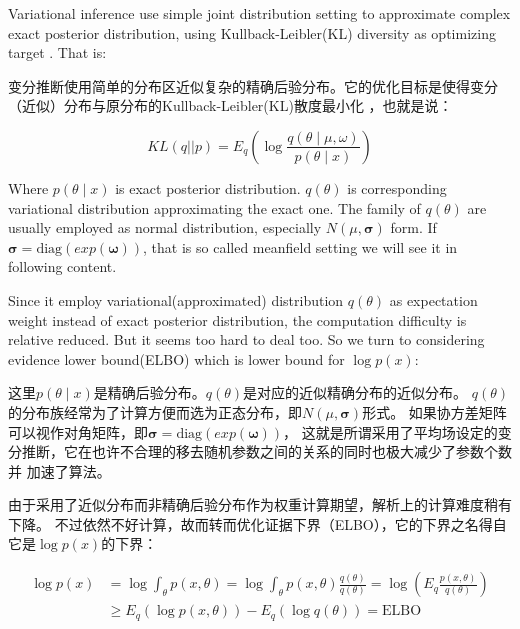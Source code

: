 \documentclass{article}
\begin{document}
Variational inference use simple joint distribution setting to approximate complex 
exact posterior distribution, using Kullback-Leibler(KL) diversity as optimizing target \cite{blei2017variational}. That is:

变分推断使用简单的分布区近似复杂的精确后验分布。它的优化目标是使得变分（近似）分布与原分布的Kullback-Leibler(KL)散度最小化
\cite{blei2017variational}，也就是说：

$$
KL(q||p) = E_q \left( \log \frac{q(\theta \mid \mu,\omega)}{p(\theta \mid x)} \right)
$$

Where $p(\theta \mid x)$ is exact posterior distribution. 
$q(\theta)$ is corresponding variational distribution approximating the exact one.
The family of $q(\theta)$ are usually employed as normal distribution, especially $N(\mu,\mathbf{\sigma})$ form.
If $\mathbf{\sigma}=\mathrm{diag}(exp(\mathbf{\omega}))$, 
that is so called meanfield setting we will see it in following content.

Since it employ variational(approximated) distribution $q(\theta)$ as expectation weight 
instead of exact posterior distribution,
the computation difficulty is relative reduced. But it seems too hard to deal too. 
So we turn to considering evidence lower bound(ELBO) which is lower bound for $\log p(x)$:

这里$p(\theta \mid x)$是精确后验分布。$q(\theta)$是对应的近似精确分布的近似分布。
$q(\theta)$的分布族经常为了计算方便而选为正态分布，即$N(\mu,\mathbf{\sigma})$形式。
如果协方差矩阵可以视作对角矩阵，即$\mathbf{\sigma}=\mathrm{diag}(exp(\mathbf{\omega}))$，
这就是所谓采用了平均场设定的变分推断，它在也许不合理的移去随机参数之间的关系的同时也极大减少了参数个数并
加速了算法。

由于采用了近似分布而非精确后验分布作为权重计算期望，解析上的计算难度稍有下降。
不过依然不好计算，故而转而优化证据下界（ELBO），它的下界之名得自它是$\log p(x)$的下界：

\begin{align*}
\log p(x) &= \log \int_\theta p(x,\theta) = \log \int_\theta p(x,\theta) \frac{q(\theta)}{q(\theta)} = \log \left( E_q \frac{p(x,\theta)}{q(\theta)} \right)  \\
          &\ge E_q (\log p(x,\theta)) - E_q(\log q(\theta)) = \mathrm{ELBO}
\end{align*}
\end{document}
